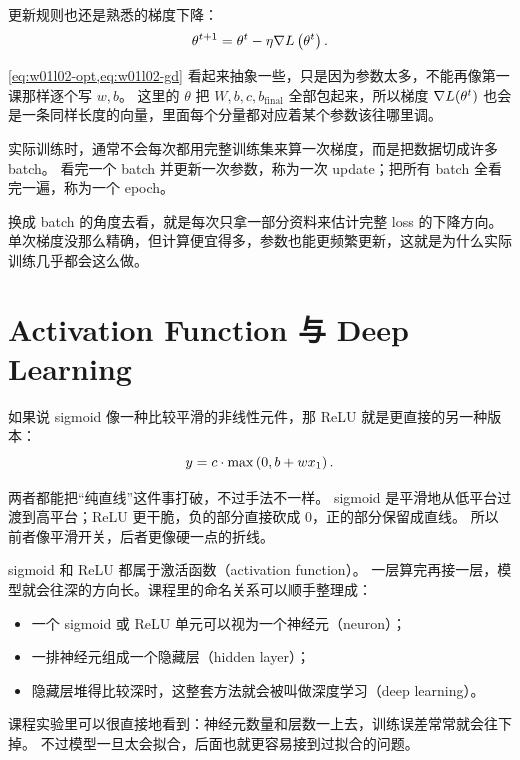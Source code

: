 \documentclass[main.tex]{subfiles}
\begin{document}
更新规则也还是熟悉的梯度下降：
\begin{equation}
  \theta^{t+1} = \theta^t - \eta \nabla L\left( \theta^t \right).
  \label{eq:w01l02-gd}
\end{equation}

\cref{eq:w01l02-opt,eq:w01l02-gd} 看起来抽象一些，只是因为参数太多，不能再像第一课那样逐个写 $w,b$。
这里的 $\theta$ 把 $W,b,c,b_{\mathrm{final}}$ 全部包起来，所以梯度 $\nabla L(\theta^t)$ 也会是一条同样长度的向量，里面每个分量都对应着某个参数该往哪里调。

\begin{definitionbox}[title={Batch 与 Epoch}]
实际训练时，通常不会每次都用完整训练集来算一次梯度，而是把数据切成许多 batch。
看完一个 batch 并更新一次参数，称为一次 update；把所有 batch 全看完一遍，称为一个 epoch。
\end{definitionbox}

换成 batch 的角度去看，就是每次只拿一部分资料来估计完整 loss 的下降方向。
单次梯度没那么精确，但计算便宜得多，参数也能更频繁更新，这就是为什么实际训练几乎都会这么做。

\section{Activation Function 与 Deep Learning}
\label{sec:w01l02-activation}

如果说 sigmoid 像一种比较平滑的非线性元件，那 ReLU 就是更直接的另一种版本：
\begin{equation}
  y = c \cdot \max\left( 0, b+wx_1 \right).
  \label{eq:w01l02-relu}
\end{equation}

两者都能把“纯直线”这件事打破，不过手法不一样。
sigmoid 是平滑地从低平台过渡到高平台；ReLU 更干脆，负的部分直接砍成 0，正的部分保留成直线。
所以前者像平滑开关，后者更像硬一点的折线。

sigmoid 和 ReLU 都属于激活函数（activation function）。
一层算完再接一层，模型就会往深的方向长。课程里的命名关系可以顺手整理成：
\begin{itemize}
  \item 一个 sigmoid 或 ReLU 单元可以视为一个神经元（neuron）；
  \item 一排神经元组成一个隐藏层（hidden layer）；
  \item 隐藏层堆得比较深时，这整套方法就会被叫做深度学习（deep learning）。
\end{itemize}

\begin{examplebox}
课程实验里可以很直接地看到：神经元数量和层数一上去，训练误差常常就会往下掉。
不过模型一旦太会拟合，后面也就更容易接到过拟合的问题。
\end{examplebox}
\end{document}
